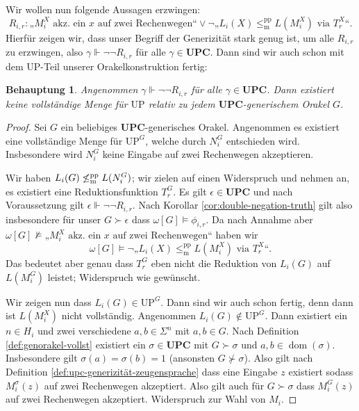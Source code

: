 \documentclass[nofonts]{uebung}
\newtheorem{claim}[theorem]{Behauptung}
\theoremstyle{definition}
\def\UP{\ensuremath{\mathrm{UP}}}
\DeclareMathOperator{\dom}{dom}
\def\leqmpp{\ensuremath{\leq_\mathrm{m}^\mathrm{pp}}}
\begin{document}
Wir wollen nun folgende Aussagen erzwingen:
\[ R_{i,r}\colon \text{„$M_i^X$ akz. ein $x$ auf zwei Rechenwegen“} \lor \neg„L_{i}(X)\leqmpp L(M_i^X)\text{ via }T^X_r“. \]
Hierfür zeigen wir, dass unser Begriff der Generizität stark genug ist, um alle $R_{i,r}$ zu erzwingen, also $\gamma\Vdash\neg\neg R_{i,r}$ für alle $\gamma\in\mathbf{UPC}$.
Dann sind wir auch schon mit dem UP-Teil unserer Orakelkonstruktion fertig:

\begin{claim}
    Angenommen $\gamma\Vdash\neg\neg  R_{i,r}$ für alle $\gamma\in\mathbf{UPC}$.
    Dann existiert keine vollständige Menge für $\UP$ relativ zu jedem $\mathbf{UPC}$-generischem Orakel $G$.
\end{claim}
\begin{proof}
    Sei $G$ ein beliebiges $\mathbf{UPC}$-generisches Orakel.
    Angenommen es existiert eine vollständige Menge für $\UP^G$, welche durch $N^G_i$ entschieden wird.
    Insbesondere wird $N^G_i$ keine Eingabe auf zwei Rechenwegen akzeptieren.

    Wir haben $L_i(G)\not\leqmpp L(N^G_i)$; wir zielen auf einen Widerspruch und nehmen an, es existiert eine Reduktionsfunktion $T_r^G$.
    Es gilt $\epsilon\in\mathbf{UPC}$ und nach Voraussetzung gilt $\epsilon\Vdash\neg\neg  R_{i,r}$.
    Nach Korollar \ref{cor:double-negation-truth} gilt also insbesondere für unser $G\succ\epsilon$ dass $\omega[G] \vDash \phi_{i, r}$.
    Da nach Annahme aber $\omega[G] \not\vDash \text{„$M_i^X$ akz. ein $x$ auf zwei Rechenwegen“}$ haben wir
    \[ \omega[G] \vDash  \neg„L_{i}(X)\leqmpp L(M_i^X)\text{ via }T^X_r“. \]
    Das bedeutet aber genau dass $T^G_r$ eben nicht die Reduktion von $L_{i}(G)$ auf $L(M_i^G)$ leistet; Widerspruch wie gewünscht.

    Wir zeigen nun dass $L_i(G)\in\UP^G$. Dann sind wir auch schon fertig, denn dann ist $L(M_i^X)$ nicht vollständig.
    Angenommen $L_i(G)\not\in\UP^G$. Dann existiert ein $n\in H_i$ und zwei verschiedene $a,b\in\Sigma^n$ mit $a,b\in G$.
    Nach Definition \ref{def:genorakel-vollst} existiert ein $\sigma\in\mathbf{UPC}$ mit $G\succ \sigma$ und $a,b\in\dom(\sigma)$.
    Insbesondere gilt $\sigma(a)=\sigma(b)=1$ (ansonsten $G\not\succ\sigma$).
    Also gilt nach Definition \ref{def:upc-generizität-zeugensprache} dass eine Eingabe $z$ existiert sodass $M_i^\sigma(z)$ auf zwei Rechenwegen akzeptiert. 
    Also gilt auch für $G\succ\sigma$ dass $M_i^G(z)$ auf zwei Rechenwegen akzeptiert.
    Widerspruch zur Wahl von $M_i$.
\end{proof}
\end{document}
